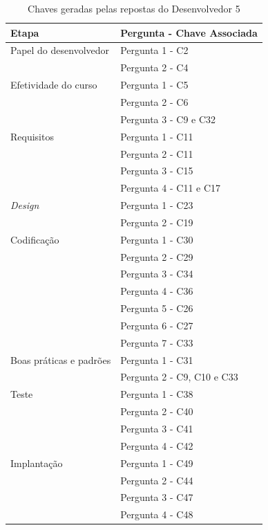 \begin{table}[h]
	\centering
	\begin{tabular}{|m{4.8cm} | m{4.8cm} |}
		\hline
		\textbf{Etapa} & \textbf{Pergunta - Chave Associada} \\ \hline
		Papel do desenvolvedor & Pergunta 1 - C2 \\ \cline{2-2}
		& Pergunta 2 - C4 \\ \cline{2-2}
		\hline
		Efetividade do curso & Pergunta 1 - C5 \\ \cline{2-2}
		& Pergunta 2 - C6 \\ \cline{2-2}
		& Pergunta 3 - C9 e C32 \\ \cline{2-2}
		\hline
		Requisitos & Pergunta 1 - C11 \\ \cline{2-2}
		 & Pergunta 2 - C11 \\ \cline{2-2}
		& Pergunta 3 - C15 \\ \cline{2-2}
		& Pergunta 4 - C11 e C17 \\ \cline{2-2}
		\hline
		\textit{Design} & Pergunta 1 - C23 \\ \cline{2-2}
		& Pergunta 2 - C19 \\ \cline{2-2}
		\hline
		Codificação & Pergunta 1 - C30 \\ \cline{2-2}
		& Pergunta 2 - C29 \\ \cline{2-2}
		& Pergunta 3 - C34 \\ \cline{2-2}
		& Pergunta 4 - C36 \\ \cline{2-2}
		& Pergunta 5 - C26 \\ \cline{2-2}
		& Pergunta 6 - C27 \\ \cline{2-2}
		& Pergunta 7 - C33 \\ \cline{2-2} \hline
		Boas práticas e padrões & Pergunta 1 - C31 \\ \cline{2-2}
		& Pergunta 2 - C9, C10 e C33 \\ \cline{2-2}
		\hline
		Teste & Pergunta 1 - C38 \\ \cline{2-2}
		& Pergunta 2 - C40 \\ \cline{2-2}
		& Pergunta 3 - C41 \\ \cline{2-2}
		& Pergunta 4 - C42 \\ \cline{2-2}
		\hline
		Implantação & Pergunta 1 - C49 \\ \cline{2-2}
		& Pergunta 2 - C44 \\ \cline{2-2}
		& Pergunta 3 - C47 \\ \cline{2-2}
		& Pergunta 4 - C48 \\ \cline{2-2}
		\hline
	\end{tabular}

	\caption{Chaves geradas pelas repostas do Desenvolvedor 5}
	\label{tab06}
\end{table}


